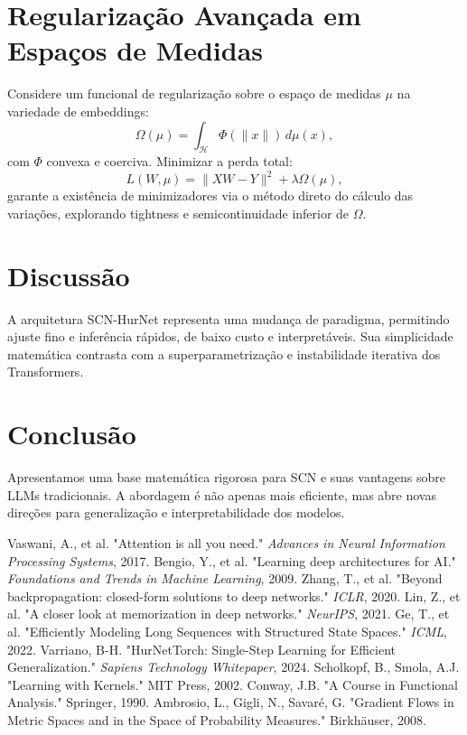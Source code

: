 \documentclass[11pt]{article}
\begin{document}
\section{Regularização Avançada em Espaços de Medidas}
Considere um funcional de regularização sobre o espaço de medidas $\mu$ na variedade de embeddings:
\begin{equation}
\Omega(\mu) = \int_{\mathcal{H}} \Phi(\|x\|) \, d\mu(x),
\end{equation}
com $\Phi$ convexa e coerciva. Minimizar a perda total:
\begin{equation}
L(W, \mu) = \|XW - Y\|^2 + \lambda \Omega(\mu),
\end{equation}
garante a existência de minimizadores via o método direto do cálculo das variações, explorando tightness e semicontinuidade inferior de $\Omega$.

\section{Discussão}
A arquitetura SCN-HurNet representa uma mudança de paradigma, permitindo ajuste fino e inferência rápidos, de baixo custo e interpretáveis. Sua simplicidade matemática contrasta com a superparametrização e instabilidade iterativa dos Transformers.

\section{Conclusão}
Apresentamos uma base matemática rigorosa para SCN e suas vantagens sobre LLMs tradicionais. A abordagem é não apenas mais eficiente, mas abre novas direções para generalização e interpretabilidade dos modelos.

\newpage
\begin{thebibliography}{9}
 Vaswani, A., et al. "Attention is all you need." \textit{Advances in Neural Information Processing Systems}, 2017.
 Bengio, Y., et al. "Learning deep architectures for AI." \textit{Foundations and Trends in Machine Learning}, 2009.
 Zhang, T., et al. "Beyond backpropagation: closed-form solutions to deep networks." \textit{ICLR}, 2020.
 Lin, Z., et al. "A closer look at memorization in deep networks." \textit{NeurIPS}, 2021.
 Ge, T., et al. "Efficiently Modeling Long Sequences with Structured State Spaces." \textit{ICML}, 2022.
 Varriano, B-H. "HurNetTorch: Single-Step Learning for Efficient Generalization." \textit{Sapiens Technology Whitepaper}, 2024.
 Scholkopf, B., Smola, A.J. "Learning with Kernels." MIT Press, 2002.
 Conway, J.B. "A Course in Functional Analysis." Springer, 1990.
 Ambrosio, L., Gigli, N., Savaré, G. "Gradient Flows in Metric Spaces and in the Space of Probability Measures." Birkhäuser, 2008.
\end{thebibliography}
\end{document}
